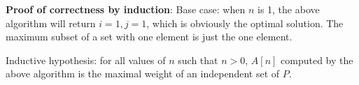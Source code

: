 \documentclass[a4paper, 10pt]{article}
\begin{document}
\begin{enumerate}
		\textbf{Proof of correctness by induction}: Base case: when $n$ is 1,
		the above algorithm will return $i = 1, j = 1$, which is obviously the
		optimal solution. The maximum subset of a set with one element is just
		the one element.

		Inductive hypothesis: for all values of $n$ such that $n > 0$, $A[n]$
		computed by the above algorithm is the maximal weight of an independent
		set of $P$.

\end{enumerate}
\end{document}
